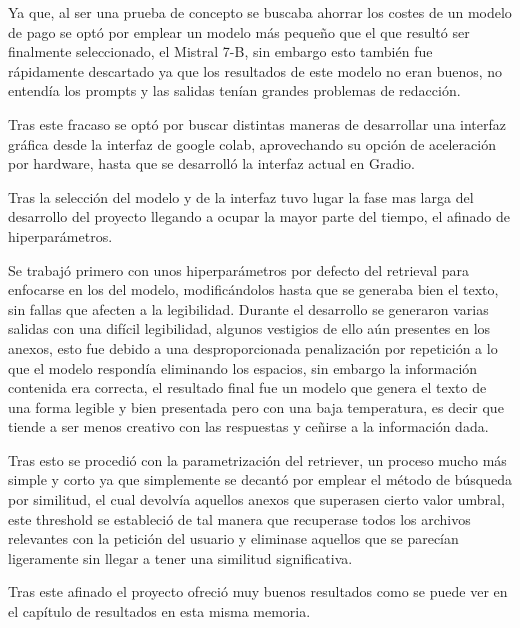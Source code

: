 Ya que, al ser una prueba de concepto se buscaba ahorrar los costes de un modelo de pago se optó por emplear un modelo más pequeño que el que resultó ser finalmente seleccionado, el Mistral 7-B, sin embargo esto también fue rápidamente descartado ya que los resultados de este modelo no eran buenos, no entendía los prompts y las salidas tenían grandes problemas de redacción.

Tras este fracaso se optó por buscar distintas maneras de desarrollar una interfaz gráfica desde la interfaz de google colab, aprovechando su opción de aceleración por hardware, hasta que se desarrolló la interfaz actual en Gradio.

Tras la selección del modelo y de la interfaz tuvo lugar la fase mas larga del desarrollo del proyecto llegando a ocupar la mayor parte del tiempo, el afinado de hiperparámetros.

Se trabajó primero con unos hiperparámetros por defecto del retrieval para enfocarse en los del modelo, modificándolos hasta que se generaba bien el texto, sin fallas que afecten a la legibilidad. Durante el desarrollo se generaron varias salidas con una difícil legibilidad, algunos vestigios de ello aún presentes en los anexos, esto fue debido a una desproporcionada penalización por repetición a lo que el modelo respondía eliminando los espacios, sin embargo la información contenida era correcta, el resultado final fue un modelo que genera el texto de una forma legible y bien presentada pero con una baja temperatura, es decir que tiende a ser menos creativo con las respuestas y ceñirse a la información dada.

Tras esto se procedió con la parametrización del retriever, un proceso mucho más simple y corto ya que simplemente se decantó por emplear el método de búsqueda por similitud, el cual devolvía aquellos anexos que superasen cierto valor umbral, este threshold se estableció de tal manera que recuperase todos los archivos relevantes con la petición del usuario y eliminase aquellos que se parecían ligeramente sin llegar a tener una similitud significativa.

Tras este afinado el proyecto ofreció muy buenos resultados como se puede ver en el capítulo de resultados en esta misma memoria.

